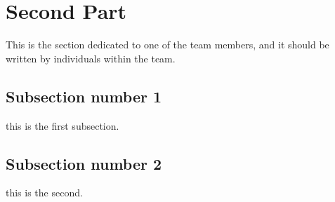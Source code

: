 \documentclass[../main/main.tex]{subfiles}
\begin{document}
\section{Second Part}
This is the section dedicated to one of the team members, and it should be written by individuals within the team. 

\subsection{Subsection number 1}
this is the first subsection.

\subsection{Subsection number 2}
this is the second.
\end{document}
